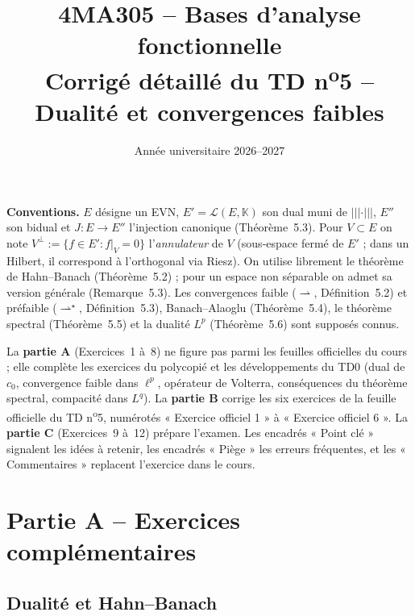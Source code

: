 \documentclass[11pt,a4paper]{article}
\title{\textbf{4MA305 -- Bases d'analyse fonctionnelle}\\[2mm]
\Large Corrigé détaillé du TD n\textsuperscript{o}5 -- Dualité et convergences faibles}
\author{}
\date{Année universitaire 2026--2027}
\newcommand{\K}{\mathbb{K}}
\newcommand{\opnorm}[1]{|\!|\!|#1|\!|\!|}
\newcommand{\Lc}{\mathcal{L}}
\newcommand{\wk}{\rightharpoonup}
\newcommand{\wks}{\rightharpoonup^{\!\star}}
\theoremstyle{definition}
\begin{document}
\maketitle

\begin{commentaire}
\textbf{Conventions.} $E$ désigne un EVN, $E'=\Lc(E,\K)$ son dual muni de $\opnorm\cdot$, $E''$ son bidual et $J:E\to E''$ l'injection canonique (Théorème~5.3). Pour $V\subset E$ on note $V^\perp:=\{f\in E':f|_V=0\}$ l'\emph{annulateur} de $V$ (sous-espace fermé de $E'$ ; dans un Hilbert, il correspond à l'orthogonal via Riesz). On utilise librement le théorème de Hahn--Banach (Théorème~5.2) ; pour un espace non séparable on admet sa version générale (Remarque~5.3). Les convergences faible ($\wk$, Définition~5.2) et préfaible ($\wks$, Définition~5.3), Banach--Alaoglu (Théorème~5.4), le théorème spectral (Théorème~5.5) et la dualité $L^p$ (Théorème~5.6) sont supposés connus.

La \textbf{partie A} (Exercices~1 à~8) ne figure pas parmi les feuilles officielles du cours ; elle complète les exercices du polycopié et les développements du TD0 (dual de $c_0$, convergence faible dans $\ell^p$, opérateur de Volterra, conséquences du théorème spectral, compacité dans $L^q$). La \textbf{partie B} corrige les six exercices de la feuille officielle du TD n\textsuperscript{o}5, numérotés « Exercice officiel 1 » à « Exercice officiel 6 ». La \textbf{partie C} (Exercices~9 à~12) prépare l'examen. Les encadrés « Point clé » signalent les idées à retenir, les encadrés « Piège » les erreurs fréquentes, et les « Commentaires » replacent l'exercice dans le cours.
\end{commentaire}

\section*{Partie A -- Exercices complémentaires}
\subsection*{Dualité et Hahn--Banach}
\end{document}
